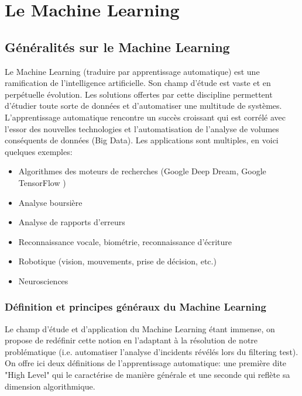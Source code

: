 \chapter{ Le  Machine Learning}
\label{Le Machine Learning}
\thispagestyle{fancy}




\section{Généralités sur le Machine Learning}
\label{Le Machine Learning: Généralités sur le Machine Learning}
Le Machine Learning (traduire par apprentissage automatique) est une ramification de l'intelligence artificielle. Son champ d'étude est vaste et en perpétuelle évolution. Les solutions offertes par cette discipline permettent d'étudier toute sorte de données et d'automatiser une multitude de systèmes. L'apprentissage automatique rencontre un succès croissant qui est corrélé avec l'essor des nouvelles technologies et l'automatisation de l'analyse de volumes conséquents de données (Big Data). Les applications sont multiples, en voici quelques exemples:  

\begin{itemize}
	\item Algorithmes des moteurs de recherches (Google Deep Dream\cite{DeepDream}, Google TensorFlow \cite{TensorFlow})
	\item Analyse boursière
	\item Analyse de rapports d'erreurs
	\item Reconnaissance vocale, biométrie, reconnaissance d'écriture
	\item Robotique (vision, mouvements, prise de décision, etc.)
	\item Neurosciences 
\end{itemize}



\subsection{Définition et principes généraux du Machine Learning}
\label{Le Machine Learning: Généralités sur le Machine Learning: Définition et principe général}
Le champ d'étude et d'application du Machine Learning étant immense, on propose de redéfinir cette notion en l'adaptant à la résolution de notre problématique (i.e. automatiser l'analyse d'incidents révélés lors du filtering test).
On offre ici deux définitions de l'apprentissage automatique: une première dite "High Level" qui le caractérise de manière générale et une seconde qui reflète sa dimension algorithmique. 

